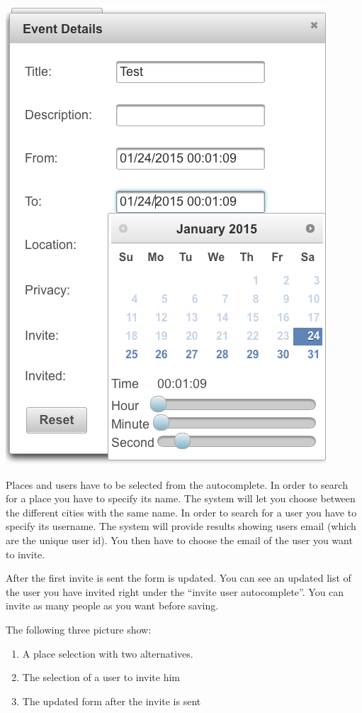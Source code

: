 \documentclass[10pt,a4paper,titlepage]{article}
\begin{document}
\begin{center}
\includegraphics[width=0.7\linewidth]{./images/10_date_select.png}
\end{center}

Places and users have to be selected from the autocomplete.
In order to search for a place you have to specify its name. The system will let you choose 
between the different cities with the same name.
In order to search for a user you have to specify its username. The system will provide results showing users email (which are the unique user id). You then have to choose the email of the user you want to invite. 

After the first invite is sent the form is updated. You can see an updated list of the user you have invited right under the “invite user autocomplete”. You can invite as many people as you want before saving.

The following three picture show: 
\begin{enumerate}
\item A place selection with two alternatives.
\item The selection of a user to invite him
\item The updated form after the invite is sent
\end{enumerate}
\end{document}
